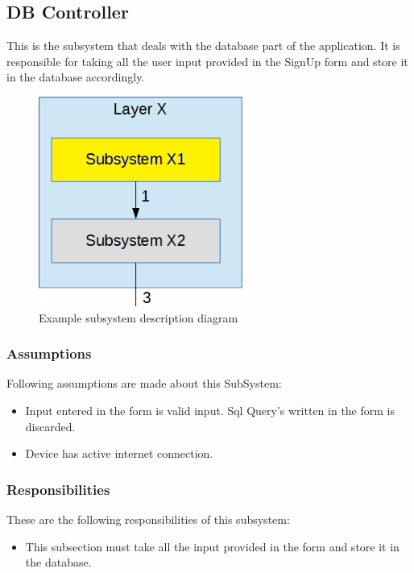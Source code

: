 \subsection{DB Controller}
This is the subsystem that deals with the database part of the application. It is responsible for taking all the user input provided in the SignUp form and store it in the database accordingly.

\begin{figure}[h!]
	\centering
 	\includegraphics[width=0.60\textwidth]{images/subsystem}
 \caption{Example subsystem description diagram}
\end{figure}

\subsubsection{Assumptions}
Following assumptions are made about this SubSystem:
\begin{itemize}
    \item Input entered in the form is valid input. Sql Query's written in the form is discarded. 
    \item Device has active internet connection.
\end{itemize}

\subsubsection{Responsibilities}
These are the following responsibilities of this subsystem:
\begin{itemize}
    \item This subsection must take all the input provided in the form and store it in the database.
\end{itemize}

